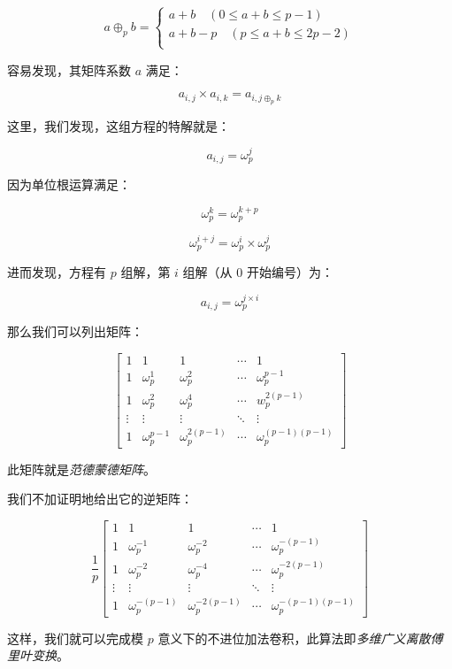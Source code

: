 \documentclass{article}
\begin{document}
$$
a \oplus_p b  =
\left\{
    \begin{array}{l}
        a+b \quad (0 \le a+b \le p-1) \\
        a+b-p \quad (p \le a+b \le 2p-2) \\
    \end{array}
\right.
$$

容易发现，其矩阵系数 $a$ 满足：

$$a_{i,j} \times a_{i,k}=a_{i,j \oplus_p k}$$

这里，我们发现，这组方程的特解就是：

$$a_{i,j} = \omega_{p}^j$$

因为单位根运算满足：

$$\omega_{p}^k = \omega_{p}^{k+p}$$

$$\omega_{p}^{i+j} = \omega_{p}^i \times \omega_{p}^j$$

进而发现，方程有 $p$ 组解，第 $i$ 组解（从 $0$ 开始编号）为：

$$a_{i,j} = \omega_{p}^{j \times i}$$

那么我们可以列出矩阵：

$$
\begin{bmatrix} 1& 1 & 1& \cdots & 1\\ 1& \omega_p^1& \omega_p^2& \cdots & \omega_p^{p - 1}\\ 1& \omega_p^2 & \omega_p^4& \cdots & w_p^{2(p - 1)}\\ \vdots& \vdots& \vdots& \ddots& \vdots\\ 1& \omega_p^{p - 1}& \omega_p^{2(p - 1)} & \cdots & \omega_p^{(p - 1)(p - 1)} \end{bmatrix}
$$

此矩阵就是\textsl{范德蒙德矩阵}。

我们不加证明地给出它的逆矩阵：

$$
\frac 1 p \begin{bmatrix} 1& 1 & 1& \cdots & 1\\ 1& \omega_p^{-1}& \omega_p^{-2}& \cdots & \omega_p^{-(p - 1)}\\ 1& \omega_p^{-2} & \omega_p^{-4}& \cdots & \omega_p^{-2(p - 1)}\\ \vdots& \vdots& \vdots& \ddots& \vdots\\ 1& \omega_p^{-(p - 1)}& \omega_p^{-2(p - 1)} & \cdots & \omega_p^{-(p - 1)(p - 1)} \end{bmatrix}
$$

这样，我们就可以完成模 $p$ 意义下的不进位加法卷积，此算法即\textsl{多维广义离散傅里叶变换}。
\end{document}
